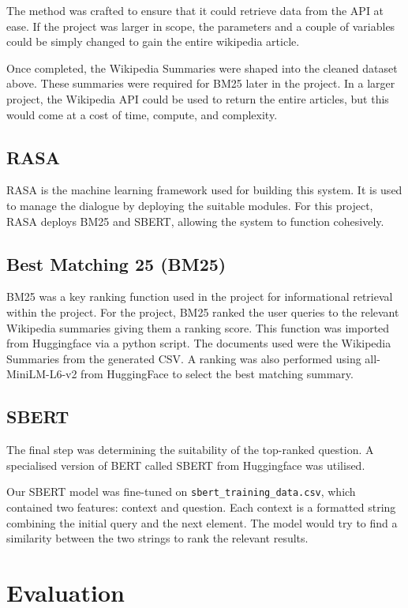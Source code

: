 \documentclass[11pt]{article}
\begin{document}
The method was crafted to ensure that it could retrieve data from the API at ease. If the project was larger in scope, the parameters and a couple of variables could be simply changed to gain the entire wikipedia article. 

Once completed, the Wikipedia Summaries were shaped into the cleaned dataset above. These summaries were required for BM25 later in the project. In a larger project, the Wikipedia API could be used to return the entire articles, but this would come at a cost of time, compute, and complexity.

\subsection{{RASA}}
RASA is the machine learning framework used for building this system. It is used to manage the dialogue by deploying the suitable modules. For this project, RASA deploys BM25 and SBERT, allowing the system to function cohesively. 

\subsection{Best Matching 25 (BM25)}
BM25 was a key ranking function used in the project for informational retrieval within the project. For the project, BM25 ranked the user queries to the relevant Wikipedia summaries giving them a ranking score. This function was imported from Huggingface via a python script. 
 \newline
 \newline
The documents used were the Wikipedia Summaries from the generated CSV. A ranking was also performed using all-MiniLM-L6-v2 from HuggingFace to select the best matching summary.

\subsection{SBERT}
The final step was determining the suitability of the top-ranked question. A specialised version of BERT called SBERT from Huggingface was utilised.

Our SBERT model was fine-tuned on \texttt{sbert\_training\_data.csv}, which contained two features: context and question. Each context is a formatted string combining the initial query and the next element. The model would try to find a similarity between the two strings to rank the relevant results.


\section{Evaluation}
\end{document}
